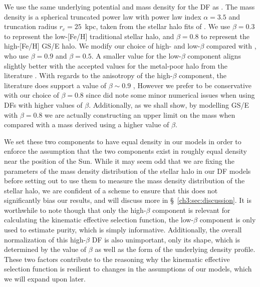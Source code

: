 We use the same underlying potential \parencite[\texttt{MWPotential2014 of }][]{bovy15} and mass density for the DF as \cite{lane22}. The mass density is a spherical truncated power law with power law index $\alpha=3.5$ and truncation radius $r_{c} = 25$~kpc, taken from the stellar halo fits of \cite{mackereth20}. We use $\beta=0.3$ to represent the low-[Fe/H] traditional stellar halo, and $\beta=0.8$ to represent the high-[Fe/H] GS/E halo. We modify our choice of high- and low-$\beta$ compared with \cite{lane22}, who use $\beta=0.9$ and $\beta=0.5$. A smaller value for the low-$\beta$ component aligns slightly better with the accepted values for the metal-poor halo from the literature \parencite{belokurov18,fattahi19,lancaster19,iorio21}. With regards to the anisotropy of the high-$\beta$ component, the literature does support a value of $\beta \sim 0.9$ \parencite{belokurov18,fattahi19,lancaster19,iorio21}, However we prefer to be conservative with our choice of $\beta=0.8$ since \cite{lane22} did note some minor numerical issues when using DFs with higher values of $\beta$. Additionally, as we shall show, by modelling GS/E with $\beta=0.8$ we are actually constructing an upper limit on the mass when compared with a mass derived using a higher value of $\beta$.

 We set these two components to have equal density in our models in order to enforce the assumption that the two components exist in roughly equal density near the position of the Sun. While it may seem odd that we are fixing the parameters of the mass density distribution of the stellar halo in our DF models before setting out to use them to measure the mass density distribution of the stellar halo, we are confident of a scheme to ensure that this does not significantly bias our results, and will discuss more in \S~\ref{ch3:sec:discussion}. It is worthwhile to note though that only the high-$\beta$ component is relevant for calculating the kinematic effective selection function, the low-$\beta$ component is only used to estimate purity, which is simply informative. Additionally, the overall normalization of this high-$\beta$ DF is also unimportant, only its shape, which is determined by the value of $\beta$ as well as the form of the underlying density profile. These two factors contribute to the reasoning why the kinematic effective selection function is resilient to changes in the assumptions of our models, which we will expand upon later.

